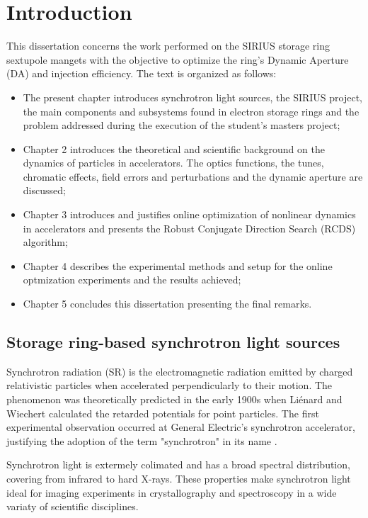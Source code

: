 \chapter{Introduction}
This dissertation concerns the work performed on the SIRIUS storage ring sextupole mangets with the objective to optimize the ring's Dynamic Aperture (DA) and injection efficiency. The text is organized as follows:
\begin{itemize}
    \item The present chapter introduces synchrotron light sources, the SIRIUS project, the main components and subsystems found in electron storage rings and the problem addressed during the execution of the student's masters project;
    \item Chapter 2 introduces the theoretical and scientific background on the dynamics of particles in accelerators. The optics functions, the tunes, chromatic effects, field errors and perturbations and the dynamic aperture are discussed;
    \item Chapter 3 introduces and justifies online optimization of nonlinear dynamics in accelerators and presents the Robust Conjugate Direction Search (RCDS) algorithm;
    \item Chapter 4 describes the experimental methods and setup for the online optmization experiments and the results achieved;
    \item Chapter 5 concludes this dissertation presenting the final remarks.
\end{itemize}

\section{Storage ring-based synchrotron light sources}
Synchrotron radiation (SR) is the electromagnetic radiation emitted by charged relativistic particles when accelerated perpendicularly to their motion. The phenomenon was theoretically predicted in the early 1900s when Liénard and Wiechert calculated the retarded potentials for point particles. The first experimental observation occurred at General Electric's synchrotron accelerator, justifying the adoption of the term "synchrotron" in its name \cite{wiedemann_particle_2015}.

Synchrotron light is extermely colimated and has a broad spectral distribution, covering from infrared to hard X-rays. These properties make synchrotron light ideal for imaging experiments in crystallography and spectroscopy in a wide variaty of scientific disciplines.

